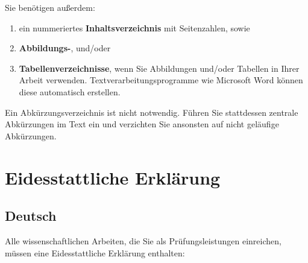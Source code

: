 \documentclass[
  letterpaper,
  DIV=11]{scrreprt}
\providecommand{\tightlist}{%
  \setlength{\itemsep}{0pt}\setlength{\parskip}{0pt}}\usepackage{longtable,booktabs,array}
\begin{document}
Sie benötigen außerdem:

\begin{enumerate}
\def\labelenumi{\arabic{enumi}.}
\tightlist
\item
  ein nummeriertes \textbf{Inhaltsverzeichnis} mit Seitenzahlen, sowie
\item
  \textbf{Abbildungs-}, und/oder
\item
  \textbf{Tabellenverzeichnisse}, wenn Sie Abbildungen und/oder Tabellen
  in Ihrer Arbeit verwenden. Textverarbeitungsprogramme wie Microsoft
  Word können diese automatisch erstellen.
\end{enumerate}

Ein Abkürzungsverzeichnis ist nicht notwendig. Führen Sie stattdessen
zentrale Abkürzungen im Text ein und verzichten Sie ansonsten auf nicht
geläufige Abkürzungen.

\section{Eidesstattliche Erklärung}\label{eidesstattliche-erkluxe4rung}

\subsection{Deutsch}\label{deutsch}

Alle wissenschaftlichen Arbeiten, die Sie als Prüfungsleistungen
einreichen, müssen eine Eidesstattliche Erklärung enthalten:
\end{document}
